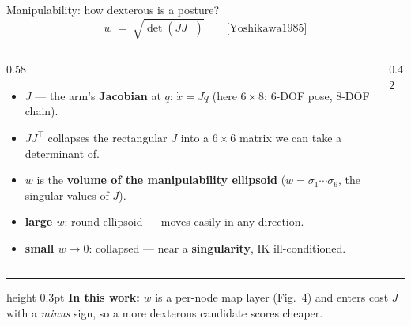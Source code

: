 \documentclass[aspectratio=169]{beamer}
\begin{document}
\begin{frame}{Manipulability: how dexterous is a posture?}
  \begin{equation*}
    w \;=\; \sqrt{\det\!\left(J J^{\top}\right)}
    \qquad\text{[Yoshikawa1985]}
  \end{equation*}
  \vspace{-0.3em}
  \begin{columns}[T]
    \begin{column}{0.58\textwidth}
      \footnotesize
      \begin{itemize}
        \item $J$ --- the arm's \textbf{Jacobian} at $q$: $\dot{x}=J\dot{q}$
              (here $6\times 8$: 6-DOF pose, 8-DOF chain).
        \item $J J^{\top}$ collapses the rectangular $J$ into a $6\times6$ matrix
              we can take a determinant of.
        \item $w$ is the \textbf{volume of the manipulability ellipsoid}
              ($w=\sigma_1\cdots\sigma_6$, the singular values of $J$).
      \end{itemize}
      \vspace{0.2em}
      \begin{itemize}
        \item[\textcolor{red!70!black}{$\blacksquare$}] \textbf{large $w$}: round
              ellipsoid --- moves easily in any direction.
        \item[\textcolor{blue!70!black}{$\blacksquare$}] \textbf{small $w\!\to\!0$}:
              collapsed --- near a \textbf{singularity}, IK ill-conditioned.
      \end{itemize}
    \end{column}
    \begin{column}{0.42\textwidth}
      \centering
    \end{column}
  \end{columns}
  \vspace{0.3em}
  \hrule height 0.3pt \vspace{0.3em}
  {\footnotesize \textbf{In this work:} $w$ is a per-node map layer (Fig.~4) and
  enters cost $J$ with a \emph{minus} sign, so a more dexterous candidate scores
  cheaper.}
\end{frame}
\end{document}
